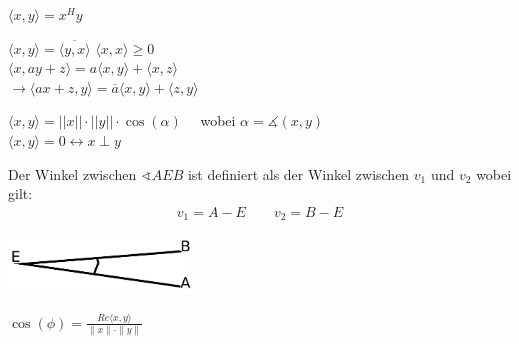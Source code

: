 \documentclass[a4paper,twocolumn]{article}
\begin{document}
		\begin{fdef}
			$\langle x,y \rangle = x^H y$
		\end{fdef}
		
		\begin{feig}[Eigenschaften SP]
			$\langle x,y \rangle = \overline{\langle y,x \rangle}$ \hspace{6mm}
			$\langle x,x \rangle \ge 0$ \\
			$\langle x,ay+z \rangle = a\langle x,y \rangle+ \langle x,z \rangle$\\
			$\rightarrow \langle ax+z,y \rangle = \overline{a} \langle x,y \rangle +\langle z,y \rangle$\\
		\end{feig}
			
		\begin{fmerke}
			$\langle x,y \rangle = ||x|| \cdot ||y|| \cdot \cos(\alpha) \quad $ wobei $\alpha = \measuredangle (x, y)$\\
			$\langle x,y \rangle = 0 \leftrightarrow x \perp y$ 
		\end{fmerke}
		
		\begin{fmerke}
				Der Winkel zwischen $\sphericalangle AEB$ ist definiert als der Winkel zwischen $v_1$ und $v_2$ wobei gilt:
				\begin{align*}
					v_1 = A-E \qquad v_2 = B-E
				\end{align*}
					
					\begin{center}
						\includegraphics[height=1.5cm]{aeb.png}
					\end{center}

		\end{fmerke}

		\begin{fmerke}
			$\cos (\phi) = \frac{Re \langle x, y \rangle}{\parallel x \parallel \cdot \parallel y \parallel}$
		\end{fmerke}
\end{document}
